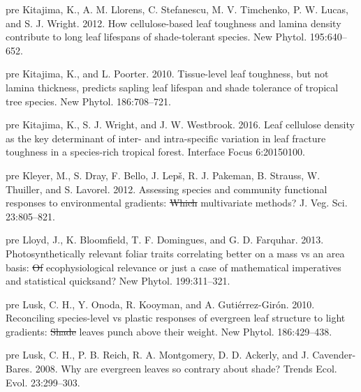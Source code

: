 \documentclass[
  12pt,
]{article}
\newlength{\cslhangindent} %
\newlength{\cslentryspacingunit} %
\newenvironment{CSLReferences}[2] %
 {%
  \setlength{\parindent}{0pt} %
  \ifodd #1 %
  \let\oldpar\par %
  \def\par{\hangindent=\cslhangindent\oldpar} %
  \fi %
  \setlength{\parskip}{#2\cslentryspacingunit} %
 }%
 {} %
\providecommand{\DIFaddtex}[1]{{\protect\color{blue}\uwave{#1}}} %
\providecommand{\DIFdeltex}[1]{{\protect\color{red}\sout{#1}}}                      %
\providecommand{\DIFaddbegin}{} %
\providecommand{\DIFaddend}{} %
\providecommand{\DIFdelbegin}{} %
\providecommand{\DIFdelend}{} %
\providecommand{\DIFadd}[1]{\texorpdfstring{\DIFaddtex{#1}}{#1}} %
\providecommand{\DIFdel}[1]{\texorpdfstring{\DIFdeltex{#1}}{}} %
\newcommand{\DIFscaledelfig}{0.5}
\newlength{\DIFdelgraphicswidth} %
\newlength{\DIFdelgraphicsheight} %
\newcommand{\DIFaddincludegraphics}[2][]{{\color{blue}\fbox{\DIFOincludegraphics[#1]{#2}}}} %
\newcommand{\DIFdelincludegraphics}[2][]{%
\sbox{\DIFdelgraphicsbox}{\DIFOincludegraphics[#1]{#2}}%
\settoboxwidth{\DIFdelgraphicswidth}{\DIFdelgraphicsbox} %
\settoboxtotalheight{\DIFdelgraphicsheight}{\DIFdelgraphicsbox} %
\scalebox{\DIFscaledelfig}{%
\parbox[b]{\DIFdelgraphicswidth}{\usebox{\DIFdelgraphicsbox}\\[-\baselineskip] \rule{\DIFdelgraphicswidth}{0em}}\llap{\resizebox{\DIFdelgraphicswidth}{\DIFdelgraphicsheight}{%
\setlength{\unitlength}{\DIFdelgraphicswidth}%
\begin{picture}(1,1)%
\thicklines\linethickness{2pt} %
{\color[rgb]{1,0,0}\put(0,0){\framebox(1,1){}}}%
{\color[rgb]{1,0,0}\put(0,0){\line( 1,1){1}}}%
{\color[rgb]{1,0,0}\put(0,1){\line(1,-1){1}}}%
\end{picture}%
}\hspace*{3pt}}} %
} %
\DeclareRobustCommand{\DIFaddbegin}{\DIFOaddbegin \let\includegraphics\DIFaddincludegraphics} %
\DeclareRobustCommand{\DIFaddend}{\DIFOaddend \let\includegraphics\DIFOincludegraphics} %
\DeclareRobustCommand{\DIFdelbegin}{\DIFOdelbegin \let\includegraphics\DIFdelincludegraphics} %
\DeclareRobustCommand{\DIFdelend}{\DIFOaddend \let\includegraphics\DIFOincludegraphics} %
\begin{document}
\begin{CSLReferences}{1}{0}
\leavevmode\DIFaddbegin \vadjust \DIFadd{pre}{\DIFaddend \hypertarget{ref-Kitajima2012}{}\DIFaddbegin }\DIFaddend %
Kitajima, K., A. M. Llorens, C. Stefanescu, M. V. Timchenko, P. W. Lucas, and S. J. Wright. 2012. How cellulose-based leaf toughness and lamina density contribute to long leaf lifespans of shade-tolerant species. New Phytol. 195:640--652.

\leavevmode\DIFaddbegin \vadjust \DIFadd{pre}{\DIFaddend \hypertarget{ref-Kitajima2010}{}\DIFaddbegin }\DIFaddend %
Kitajima, K., and L. Poorter. 2010. Tissue-level leaf toughness, but not lamina thickness, predicts sapling leaf lifespan and shade tolerance of tropical tree species. New Phytol. 186:708--721.

\leavevmode\DIFaddbegin \vadjust \DIFadd{pre}{\DIFaddend \hypertarget{ref-Kitajima2016}{}\DIFaddbegin }\DIFaddend %
Kitajima, K., S. J. Wright, and J. W. Westbrook. 2016. Leaf cellulose density as the key determinant of inter- and intra-specific variation in leaf fracture toughness in a species-rich tropical forest. Interface Focus 6:20150100.

\leavevmode\DIFaddbegin \vadjust \DIFadd{pre}{\DIFaddend \hypertarget{ref-Kleyer2012}{}\DIFaddbegin }\DIFaddend %
Kleyer, M., S. Dray, F. Bello, J. Lepš, R. J. Pakeman, B. Strauss, W. Thuiller, and S. Lavorel. 2012. Assessing species and community functional responses to environmental gradients: \DIFdelbegin \DIFdel{Which }\DIFdelend \DIFaddbegin {\DIFadd{Which}} \DIFaddend multivariate methods? J. Veg. Sci. 23:805--821.

\leavevmode\DIFaddbegin \vadjust \DIFadd{pre}{\DIFaddend \hypertarget{ref-Lloyd2013}{}\DIFaddbegin }\DIFaddend %
Lloyd, J., K. Bloomfield, T. F. Domingues, and G. D. Farquhar. 2013. Photosynthetically relevant foliar traits correlating better on a mass vs an area basis: \DIFdelbegin \DIFdel{Of }\DIFdelend \DIFaddbegin {\DIFadd{Of}} \DIFaddend ecophysiological relevance or just a case of mathematical imperatives and statistical quicksand? New Phytol. 199:311--321.

\leavevmode\DIFaddbegin \vadjust \DIFadd{pre}{\DIFaddend \hypertarget{ref-Lusk2010}{}\DIFaddbegin }\DIFaddend %
Lusk, C. H., Y. Onoda, R. Kooyman, and A. Gutiérrez-Girón. 2010. Reconciling species-level vs plastic responses of evergreen leaf structure to light gradients: \DIFdelbegin \DIFdel{Shade }\DIFdelend \DIFaddbegin {\DIFadd{Shade}} \DIFaddend leaves punch above their weight. New Phytol. 186:429--438.

\leavevmode\DIFaddbegin \vadjust \DIFadd{pre}{\DIFaddend \hypertarget{ref-Lusk2008}{}\DIFaddbegin }\DIFaddend %
Lusk, C. H., P. B. Reich, R. A. Montgomery, D. D. Ackerly, and J. Cavender-Bares. 2008. Why are evergreen leaves so contrary about shade? Trends Ecol. Evol. 23:299--303.


\end{CSLReferences}
\end{document}

